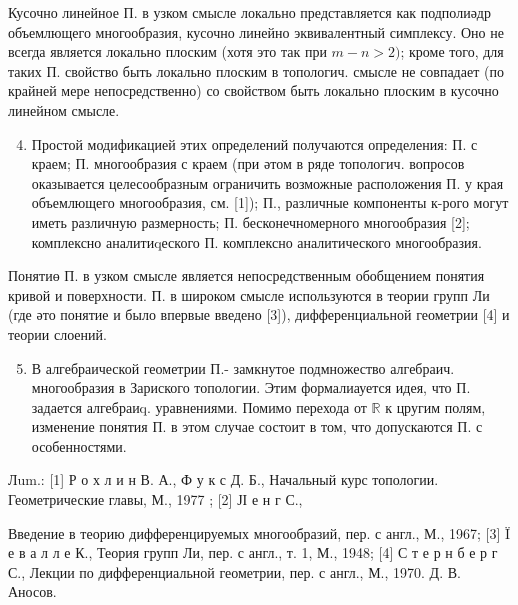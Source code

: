 \documentclass[10pt]{article}
\begin{document}
Кусочно линейное П. в узком смысле локально представляется как подполиәдр объемлющего многообразия, кусочно линейно эквивалентный симплексу. Оно не всегда является локально плоским (хотя это так при $m-n>2)$; кроме того, для таких П. свойство быть локально плоским в топологич. смысле не совпадает (по крайней мере непосредственно) со свойством быть локально плоским в кусочно линейном смысле.



\begin{enumerate}

  \setcounter{enumi}{3}

  \item Простой модификацией этих определений получаются определения: П. с краем; П. многообразия с краем (при әтом в ряде топологич. вопросов оказывается целесообразным ограничить возможные расположения П. у края объемлющего многообразия, см. [1]); П., различные компоненты к-рого могут иметь различную размерность; П. бесконечномерного многообразия [2]; комплексно аналитиqеского П. комплексно аналитического многообразия.

\end{enumerate}



Понятиө П. в узком смысле является непосредственным обобщением понятия кривой и поверхности. П. в широком смысле используются в теории групп Ли (где әто понятие и было впервые введено [3]), дифференциальной геометрии [4] и теории слоений.



\begin{enumerate}

  \setcounter{enumi}{4}

  \item В алгебраической геометрии П.- замкнутое подмножество алгебраич. многообразия в Зариского топологии. Этим формалиауется идея, что П. задается алгебраиq. уравнениями. Помимо перехода от $\mathbb{R}$ к цругим полям, изменение понятия П. в этом случае состоит в том, что допускаются П. с особенностями.

\end{enumerate}



Лum.: [1] Р о х л и н В. А., Ф у к с Д. Б., Начальный курс топологии. Геометрические главы, М., 1977 ; [2] ЈІ е н г С.,

Введение в теорию дифференцируемых многообразий, пер. с англ., М., 1967; [3] Ï е в а л л е К., Теория групп Ли, пер. с англ., т. 1, М., 1948; [4] С т е р н б е р г С., Лекции по дифференциальной геометрии, пер. с англ., М., 1970. Д. В. Аносов.
\end{document}
